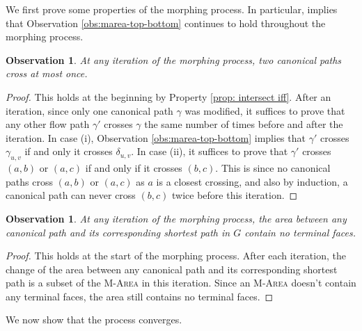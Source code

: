 \documentclass[11pt]{article}
\newtheorem{observation}[theorem]{Observation}
\begin{document}
We first prove some properties of the morphing process. In particular,  implies that Observation \ref{obs:marea-top-bottom} continues to hold throughout the morphing process.
\begin{observation}\label{obs:flow-path-cross-iff-cross}
    At any iteration of the morphing process, two canonical paths cross at most once.
\end{observation}
\begin{proof}
This holds at the beginning by Property \ref{prop: intersect iff}. After an iteration, since only one canonical path $\gamma$ was modified, it suffices to prove that any other flow path $\gamma'$ crosses $\gamma$ the same number of times before and after the iteration. In case (i), Observation \ref{obs:marea-top-bottom} implies that $\gamma'$ crosses $\gamma_{u,v}$ if and only it crosses $\delta_{u,v}$. In case (ii), it suffices to prove that $\gamma'$ crosses $(a,b)$ or $(a,c)$ if and only if it crosses $(b,c)$. This is since no canonical paths cross $(a,b)$ or $(a,c)$ as $a$ is a closest crossing, and also by induction, a canonical path can never cross $(b,c)$ twice before this iteration.
\end{proof}

\begin{observation}\label{obs:flow-shortest-no-face}
    At any iteration of the morphing process, the area between any canonical path and its corresponding shortest path in $G$ contain no terminal faces.
\end{observation}
\begin{proof}
This holds at the start of the morphing process. After each iteration, the change of the area between any canonical path and its corresponding shortest path is a subset of the \textsc{M-Area} in this iteration. Since an \textsc{M-Area} doesn't contain any terminal faces, the area still contains no terminal faces.
\end{proof}

We now show that the process converges.
\end{document}

